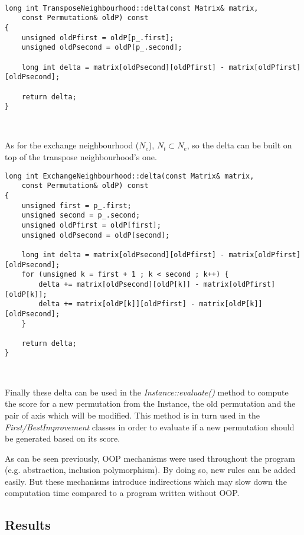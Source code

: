 \begin{lstlisting}

long int TransposeNeighbourhood::delta(const Matrix& matrix,
    const Permutation& oldP) const
{
    unsigned oldPfirst = oldP[p_.first];
    unsigned oldPsecond = oldP[p_.second];

    long int delta = matrix[oldPsecond][oldPfirst] - matrix[oldPfirst][oldPsecond];

    return delta;
}
\end{lstlisting}
\

As for the exchange neighbourhood ($N_e$), $N_t \subset N_e$, so the delta can
be built on top of the transpose neighbourhood's one.\\

\begin{lstlisting}
long int ExchangeNeighbourhood::delta(const Matrix& matrix,
    const Permutation& oldP) const
{
    unsigned first = p_.first;
    unsigned second = p_.second;
    unsigned oldPfirst = oldP[first];
    unsigned oldPsecond = oldP[second];

    long int delta = matrix[oldPsecond][oldPfirst] - matrix[oldPfirst][oldPsecond];
    for (unsigned k = first + 1 ; k < second ; k++) {
        delta += matrix[oldPsecond][oldP[k]] - matrix[oldPfirst][oldP[k]];
        delta += matrix[oldP[k]][oldPfirst] - matrix[oldP[k]][oldPsecond];
    }

    return delta;
}
\end{lstlisting}
\

Finally these delta can be used in the \emph{Instance::evaluate()} method to
compute the score for a new permutation from the Instance, the old permutation
and the pair of axis which will be modified. This method is in turn used in
the \emph{First/BestImprovement} classes in order to evaluate if a new
permutation should be generated based on its score.\\

\begin{framewarning}
	As can be seen previously, OOP mechanisms were used throughout the program
	(e.g. abstraction, inclusion polymorphism). By doing so, new rules can be
	added easily. But these mechanisms introduce indirections which may slow
	down the computation time compared to a program written without OOP.
\end{framewarning}

\newpage

\subsection{Results}

